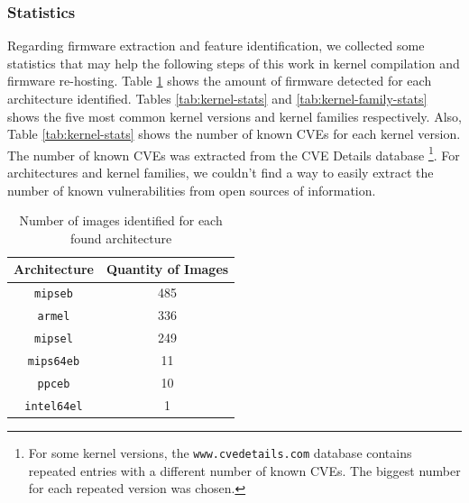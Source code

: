 \documentclass[12pt]{article}
\begin{document}

\subsubsection{Statistics}

Regarding firmware extraction and feature identification, we collected some statistics that may help the following steps of this work in kernel compilation and firmware re-hosting. Table \ref{tab:arch-stats} shows the amount of firmware detected for each architecture identified. Tables \ref{tab:kernel-stats} and \ref{tab:kernel-family-stats} shows the five most common kernel versions and kernel families respectively. Also, Table \ref{tab:kernel-stats} shows the number of known CVEs for each kernel version. The number of known CVEs was extracted from the CVE Details \cite{cvedetails} database \footnote{For some kernel versions, the {\tt www.cvedetails.com} database contains repeated entries with a different number of known CVEs. The biggest number for each repeated version was chosen.}. For architectures and kernel families, we couldn't find a way to easily extract the number of known vulnerabilities from open sources of information.

\begin{table}[h]
\centering
\caption{Number of images identified for each found architecture}
\begin{tabular}{|c|c|}
\hline
\textbf{Architecture} & \textbf{Quantity of Images} \\ \hline
{\tt mipseb}                & 485                         \\ \hline
{\tt armel}                 & 336                         \\ \hline
{\tt mipsel}                & 249                         \\ \hline
{\tt mips64eb}              & 11                          \\ \hline
{\tt ppceb}                 & 10                          \\ \hline
{\tt intel64el}             & 1                           \\ \hline
\end{tabular}
\label{tab:arch-stats}
\end{table}
\end{document}
